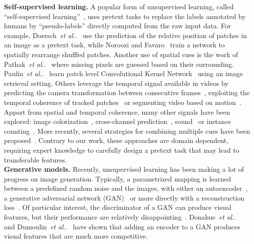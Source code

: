 \documentclass[runningheads]{llncs}
\makeatletter
\DeclareRobustCommand\onedot{\futurelet\@let@token\@onedot}
\def\@onedot{\ifx\@let@token.\else.\null\fi\xspace}
\def\etal{\emph{et al}\onedot}
\makeatother
\begin{document}
\noindent\textbf{Self-supervised learning.}
A popular form of unsupervised learning, called ``self-supervised learning''~\cite{de1994learning},
uses pretext tasks to replace the labels annotated by humans by ``pseudo-labels'' directly computed from the raw input data.
For example,
Doersch~\etal~\cite{doersch2015unsupervised} use the prediction of the relative position of patches in an image as a pretext task,
while Noroozi and Favaro~\cite{noroozi2016unsupervised} train a network to spatially rearrange shuffled patches.
Another use of spatial cues is the work of Pathak~\etal~\cite{pathak2016context} where missing pixels are guessed based
on their surrounding.
Paulin~\etal~\cite{paulin2015local} learn patch level Convolutional Kernel Network~\cite{mairal2014convolutional} using an image retrieval setting. 
Others leverage the temporal signal available in videos by 
predicting the camera transformation between consecutive frames~\cite{agrawal2015learning}, exploiting the temporal coherence of tracked patches~\cite{wang2015unsupervised} or segmenting video based on motion~\cite{pathak2016learning}. 
Appart from spatial and temporal coherence, many other signals have been explored: image colorization~\cite{zhang2016colorful,larsson2016learning}, cross-channel prediction~\cite{zhang2016split}, sound~\cite{owens2016ambient} or instance counting~\cite{noroozi2017representation}.
More recently, several strategies for combining multiple cues have been proposed~\cite{wang2017transitive,doersch2017multi}.
Contrary to our work, these approaches are domain dependent, requiring expert knowledge 
to carefully design a pretext task that may lead to transferable features.
\\

\noindent\textbf{Generative models.}
Recently, unsupervised learning has been making a lot of progress on image generation.
Typically, a parametrized mapping is learned between a predefined random noise and the images,
with either an autoencoder~\cite{kingma2013auto,bengio2007greedy,huang2007unsupervised,masci2011stacked,vincent2010stacked}, 
a generative adversarial network (GAN)~\cite{goodfellow2014generative} 
or more directly with a reconstruction loss~\cite{bojanowski2017optimizing}.
Of particular interest, 
the discriminator of a GAN can produce visual features, but their performance are relatively disappointing~\cite{donahue2016adversarial}. 
Donahue~\etal~\cite{donahue2016adversarial} and Dumoulin~\etal~\cite{dumoulin2016adversarially} have shown that adding an encoder
to a GAN produces visual features that are much more competitive.
\end{document}
